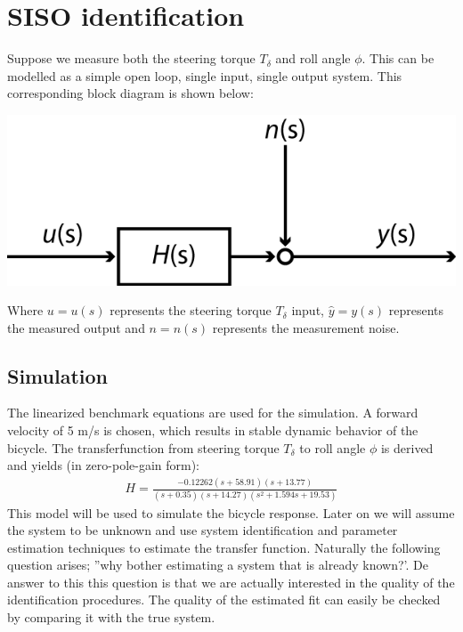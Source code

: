 \section{SISO identification}
Suppose we measure both the steering torque $T_\delta$ and roll angle $\phi$. This can be modelled as a simple open loop, single input, single output system. This corresponding block diagram is shown below:
	\begin{center}
		\includegraphics{images/SISOblock}
		\label{fig:SISOblock}
	\end{center}
	Where $u = u(s)$ represents the steering torque $T_\delta$ input, $\hat{y}= y(s)$ represents the measured output and $n= n(s)$ represents the measurement noise. 
\subsection{Simulation}
The linearized benchmark equations are used for the simulation. A forward velocity of 5 m/s is chosen, which results in stable dynamic behavior of the bicycle. The transferfunction from steering torque $T_\delta$ to roll angle $\phi$ is derived and yields (in zero-pole-gain form):
\begin{align}
H =   \frac{  -0.12262 (s+58.91) (s+13.77)  }{ (s+0.35) (s+14.27) (s^2 + 1.594s + 19.53) } 
\end{align}
This model will be used to simulate the bicycle response. Later on we will assume the system to be unknown and use system identification and parameter estimation techniques to estimate the  transfer function. Naturally the following question arises; ''why bother estimating a system that is already known?'. De answer to this this question is that we are actually interested in the quality of the identification procedures. The quality of the estimated fit can easily be checked by comparing it with the true system.

